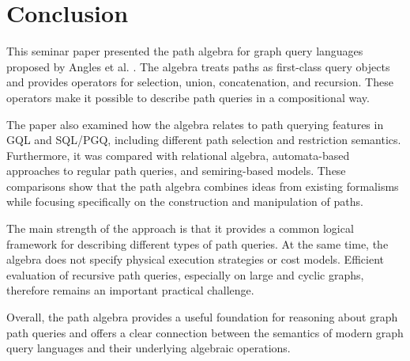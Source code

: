 \section{Conclusion}

This seminar paper presented the path algebra for graph query languages proposed by Angles et al. \cite{angles2024path}. The algebra treats paths as first-class query objects and provides operators for selection, union, concatenation, and recursion. These operators make it possible to describe path queries in a compositional way.

The paper also examined how the algebra relates to path querying features in GQL and SQL/PGQ, including different path selection and restriction semantics. Furthermore, it was compared with relational algebra, automata-based approaches to regular path queries, and semiring-based models. These comparisons show that the path algebra combines ideas from existing formalisms while focusing specifically on the construction and manipulation of paths.

The main strength of the approach is that it provides a common logical framework for describing different types of path queries. At the same time, the algebra does not specify physical execution strategies or cost models. Efficient evaluation of recursive path queries, especially on large and cyclic graphs, therefore remains an important practical challenge.

Overall, the path algebra provides a useful foundation for reasoning about graph path queries and offers a clear connection between the semantics of modern graph query languages and their underlying algebraic operations.